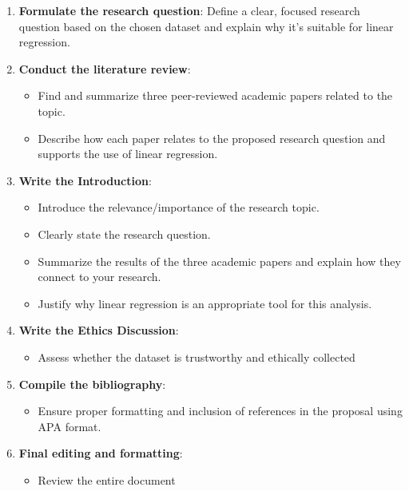 \documentclass[
  letterpaper,
  DIV=11,
  numbers=noendperiod]{scrartcl}
\providecommand{\tightlist}{%
  \setlength{\itemsep}{0pt}\setlength{\parskip}{0pt}}\usepackage{longtable,booktabs,array}
\begin{document}
\begin{enumerate}
\def\labelenumi{\arabic{enumi}.}
\tightlist
\item
  \textbf{Formulate the research question}: Define a clear, focused
  research question based on the chosen dataset and explain why it's
  suitable for linear regression.
\item
  \textbf{Conduct the literature review}:

  \begin{itemize}
  \tightlist
  \item
    Find and summarize three peer-reviewed academic papers related to
    the topic.
  \item
    Describe how each paper relates to the proposed research question
    and supports the use of linear regression.
  \end{itemize}
\item
  \textbf{Write the Introduction}:

  \begin{itemize}
  \tightlist
  \item
    Introduce the relevance/importance of the research topic.
  \item
    Clearly state the research question.
  \item
    Summarize the results of the three academic papers and explain how
    they connect to your research.
  \item
    Justify why linear regression is an appropriate tool for this
    analysis.
  \end{itemize}
\item
  \textbf{Write the Ethics Discussion}:

  \begin{itemize}
  \tightlist
  \item
    Assess whether the dataset is trustworthy and ethically collected
  \end{itemize}
\item
  \textbf{Compile the bibliography}:

  \begin{itemize}
  \tightlist
  \item
    Ensure proper formatting and inclusion of references in the proposal
    using APA format.
  \end{itemize}
\item
  \textbf{Final editing and formatting}:

  \begin{itemize}
  \tightlist
  \item
    Review the entire document
  \end{itemize}
\end{enumerate}
\end{document}
